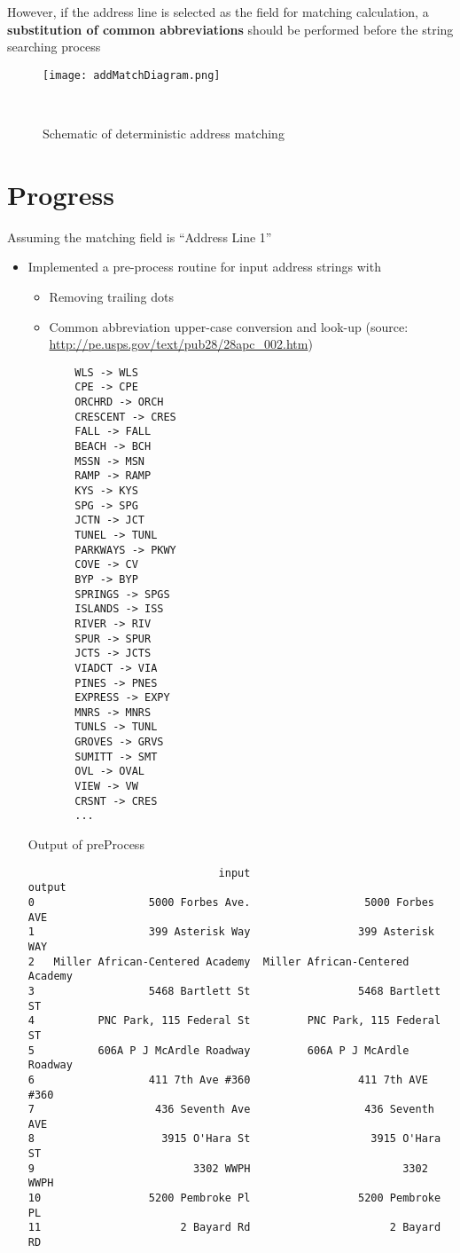 \documentclass[12pt]{article}
\begin{document}
However, if the address line is selected as the field for matching
calculation, a \textbf{substitution of common abbreviations} should be
performed before the string searching process

\begin{figure}[h!]
  \centering
  \texttt{[image: addMatchDiagram.png]}
  \caption{Schematic of deterministic address matching}~\cite{citeulike1466288}
  \label{fig:addMatchDiagram}
\end{figure}

\pagebreak
\section{Progress}
Assuming the matching field is ``Address Line 1''
\begin{itemize}
\item Implemented a pre-process routine for input address strings with
  \begin{itemize}
  \item Removing trailing dots
  \item Common abbreviation upper-case conversion and look-up (source: \url{http://pe.usps.gov/text/pub28/28apc_002.htm})
    \begin{verbatim}
    WLS -> WLS
    CPE -> CPE
    ORCHRD -> ORCH
    CRESCENT -> CRES
    FALL -> FALL
    BEACH -> BCH
    MSSN -> MSN
    RAMP -> RAMP
    KYS -> KYS
    SPG -> SPG
    JCTN -> JCT
    TUNEL -> TUNL
    PARKWAYS -> PKWY
    COVE -> CV
    BYP -> BYP
    SPRINGS -> SPGS
    ISLANDS -> ISS
    RIVER -> RIV
    SPUR -> SPUR
    JCTS -> JCTS
    VIADCT -> VIA
    PINES -> PNES
    EXPRESS -> EXPY
    MNRS -> MNRS
    TUNLS -> TUNL
    GROVES -> GRVS
    SUMITT -> SMT
    OVL -> OVAL
    VIEW -> VW
    CRSNT -> CRES
    ...
    \end{verbatim}
  \end{itemize}

  Output of preProcess
\begin{verbatim}
                              input                           output
0                  5000 Forbes Ave.                  5000 Forbes AVE
1                  399 Asterisk Way                 399 Asterisk WAY
2   Miller African-Centered Academy  Miller African-Centered Academy
3                  5468 Bartlett St                 5468 Bartlett ST
4          PNC Park, 115 Federal St         PNC Park, 115 Federal ST
5          606A P J McArdle Roadway         606A P J McArdle Roadway
6                  411 7th Ave #360                 411 7th AVE #360
7                   436 Seventh Ave                  436 Seventh AVE
8                    3915 O'Hara St                   3915 O'Hara ST
9                         3302 WWPH                        3302 WWPH
10                 5200 Pembroke Pl                 5200 Pembroke PL
11                      2 Bayard Rd                      2 Bayard RD
\end{verbatim}


\end{itemize}
\end{document}
